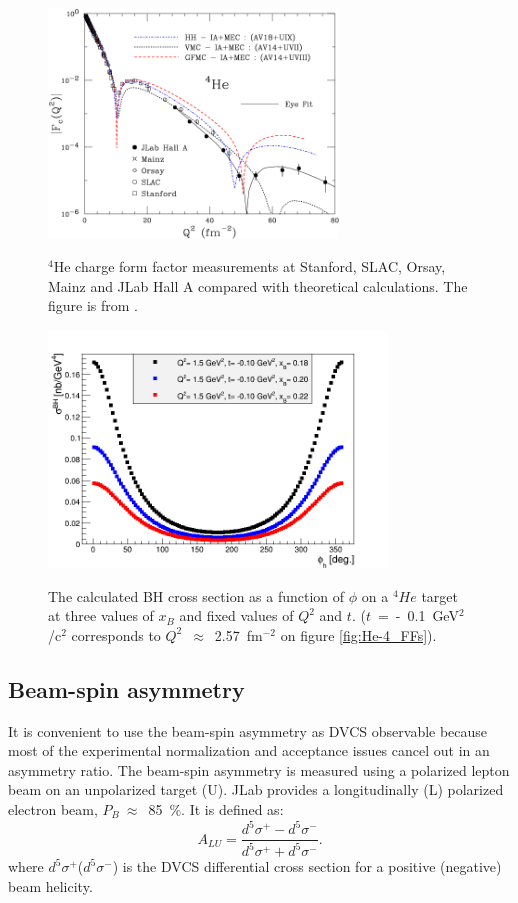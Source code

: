 \begin{figure}[tp]
\begin{minipage}[c]{.46\linewidth}
\hspace{-0.2in}\includegraphics[height=6.1cm]{fig/He-4_FF.png}
\caption{$^4$He charge form factor measurements at Stanford, SLAC, Orsay, Mainz and JLab Hall A compared with theoretical calculations. The figure is from \cite{He_4_FF}. } 
\label{fig:He-4_FFs}
\end{minipage} \hfill
\begin{minipage}[c]{.46\linewidth}
\hspace{-0.3in}\includegraphics[height=6.3cm]{fig/BH_He-4.png}
\caption{The calculated BH cross section as a function of $\phi$ on a $^4He$ target at three values of $x_{B}$ and fixed values of $Q^{2}$ and $t$. ($t$~=~-~0.1~GeV$^2$/c$^2$ corresponds to $Q^2$~$\approx$~2.57~fm$^{-2}$ on figure \ref{fig:He-4_FFs}).}
\vspace{+0.3in}
\label{fig:BH_cross_section_4He}
\end{minipage}
\end{figure}


\subsection{Beam-spin asymmetry}
It is convenient to use the beam-spin asymmetry as DVCS observable because most of the experimental normalization and acceptance issues cancel out in an asymmetry ratio. The beam-spin asymmetry is measured using a polarized lepton beam on an unpolarized target (U). JLab provides a longitudinally (L) polarized electron beam, $P_{B}~\approx$~85~$\%$. It is defined as:
  \begin{equation}
  A_{LU} = \frac{d^{5}\sigma^{+} - d^{5}\sigma^{-} }
                {d^{5}\sigma^{+} + d^{5}\sigma^{-}}.
    \label{BSA_equation}
  \end{equation}
  where $d^{5}\sigma^{+}$($d^{5}\sigma^{-}$) is the DVCS differential cross section for a positive (negative) beam helicity.

